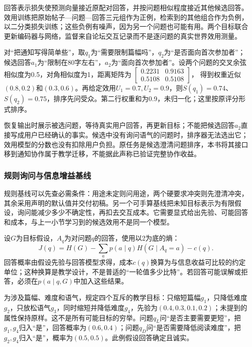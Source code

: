 回答表示损失使预测向量接近原配对回答，并按问题相似程度接近其他候选回答。效用训练把原始帖子—问题—回答三元组作为正例，检索到的其他组合作为负例，以二分类损失训练；这些负例有噪声，因为另一个问题也可能有用。两个目标联合更新编码器与网络，监督来自论坛交互记录而不是逐问题的真实世界效用测量。

对“把通知写得简单些”，取$q_1$为“需要限制篇幅吗”，$q_2$为“是否面向首次参加者”；候选回答$a_1$为“限制在80字左右”，$a_2$为“面向首次参加者”。设两个问题的交叉余弦相似度为0.5，对角相似度为1，距离矩阵为
$\left[\begin{smallmatrix}0.2231&0.9163\\0.5108&0.5108\end{smallmatrix}\right]$，
得到权重近似$(0.8,0.2)$和$(0.3,0.6)$。再给定效用$U_1=0.7,U_2=0.9$，则$S(q_1)=0.74$、$S(q_2)=0.75$，排序先问受众。第二行权重和为0.9，未归一化；这里按原评分形式排序。

恢复输出时展示被选问题，等待真实用户回答，再更新目标；不能把候选回答$a_2$直接写成用户已经确认的事实。候选中没有询问语气的问题时，排序器无法选出它；效用模型的分数也没有扣除用户负担。原任务是候选澄清问题排序，本书将其接口移到通知协作属于教学迁移，不能据此声称已验证完整协作收益。

\subsubsection{规则询问与信息增益基线}
\label{sec:nlp-dialogue-information-gain}

规则基线可以先查必需条件：用途未定则问用途，两个硬要求冲突则先澄清冲突，其余采用声明的默认值并交付初稿。另一个可手算基线把未知目标表示为有限假设，询问能减少多少不确定性，再扣去交互成本。它需要显式给出先验、可能回答和成本，与上一小节学习到的候选效用不是同一个模型。

设$G$为目标假设，$A_q$为对问题$q$的回答，使用以2为底的熵：
\begin{equation}
 J(q)=H(G)-\sum_a p(a\mid q)H(G\mid A_q=a)-c(q).
 \label{eq:nlp-dialogue-information-gain}
\end{equation}
回答概率由假设先验与回答模型求得，成本$c(q)$换算为与信息收益可比较的约定单位；这种换算是教学设计，不是普适的“一轮值多少比特”。若回答可能误解或拒答，必须在$p(a\mid q,G)$中加入这些结果。

为涉及篇幅、难度和语气，规定四个互斥的教学目标：只缩短篇幅$g_1$，只降低难度$g_2$，只放松语气$g_3$，同时缩短并降低难度$g_4$，先验为$(0.4,0.3,0.1,0.2)$；未提到的属性保持原样。这不是所有可能目标的穷举。问题$q_L$问“是否主要需要更短”，把$g_1,g_4$归入“是”，回答概率为$(0.6,0.4)$；问题$q_D$问“是否需要降低阅读难度”，把$g_2,g_4$归入“是”，概率为$(0.5,0.5)$。此例假设回答确定且诚实。


